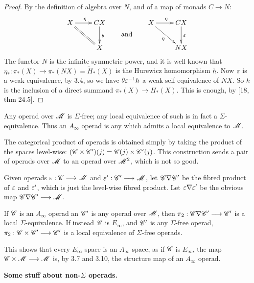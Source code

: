 \documentclass[11pt]{article}
\begin{document}
\begin{chapter1-3}
\begin{prop*}[3.6]
\end{prop*}
\begin{proof}
By the definition of algebra over $N$, and of a map of monads $C\to N$:
\[\xymatrix{
X\ar[r]^\eta&CX\ar[d]^\theta\\
&X\ar@{=}[ul]
}
\raisebox{-.6cm}{\text{\qquad and\qquad}}
\xymatrix{
X\ar[dr]_{\eta}\ar[r]^\eta&CX\ar[d]^\eps\\
&NX
}\]
The functor $N$ is the infinite symmetric power, and it is well known that
$\eta_*:\pi_*(X)\to\pi_*(NX)=\widetilde H_*(X)$ is the Hurewicz homomorphism $h$.
Now $\varepsilon$ is a weak equivalence, by 3.4, so we have $\theta\varepsilon^{-1}h$ a weak
self equivalence of $NX$. So $h$ is the inclusion of a direct summand
$\pi_*(X)\to H_*(X)$. This is enough, by [18, thm 24.5].
\end{proof}
\begin{lem*}[3.7]
Any operad over $\mathscr{M}$ is $\Sigma$-free; any local equivalence of such is
in fact a $\Sigma$-equivalence.
Thus an $A_\infty$ operad is any which admits a local equivalence to $\mathscr{M}$.
\end{lem*}
The categorical product of operads is obtained simply by taking the product
of the spaces level-wise: $(\mathscr{C}\times\mathscr{C}')(j)=\mathscr{C}(j)\times\mathscr{C}'(j)$.
This construction sends a pair of operads over $\mathscr{M}$ to an operad over
$\mathscr{M}^2$, which is not so good.
\begin{defn*}[3.9]
Given operads $\varepsilon:\mathscr{C}\longrightarrow\mathscr{M}$ and $\varepsilon':\mathscr{C}'\longrightarrow\mathscr{M}$, let 
$\mathscr{C}\nabla\mathscr{C}'$ be the fibred product of $\varepsilon$ and $\varepsilon'$, which is
just the level-wise fibred product. Let $\varepsilon\nabla\varepsilon'$ be the obvious
map $\mathscr{C}\nabla\mathscr{C}'\longrightarrow\mathscr{M}$.
\end{defn*}
\begin{prop*}[3.10]
If $\mathscr{C}$ is an $A_\infty$ operad an $\mathscr{C}'$ is any operad over $\mathscr{M}$, then
$\pi_2:\mathscr{C}\nabla\mathscr{C}'\longrightarrow\mathscr{C}'$ is a local $\Sigma$-equivalence. If instead
$\mathscr{C}$ is $E_\infty$, and $\mathscr{C}'$ is any $\Sigma$-free operad,
$\pi_2:\mathscr{C}\times\mathscr{C}'\longrightarrow\mathscr{C}'$ is a local equivalence of $\Sigma$-free
operads.
\end{prop*}\noindent
This shows that every $E_\infty$ space is an $A_\infty$ space, as if $\mathscr{C}$
is $E_\infty$, the map $\mathscr{C}\times\mathscr{M}\longrightarrow\mathscr{M}$ is, by 3.7 and 3.10,
the structure map of an $A_\infty$ operad. 

\noindent\textbf{Some stuff about non-$\Sigma$ operads.}
\end{chapter1-3}
\end{document}
